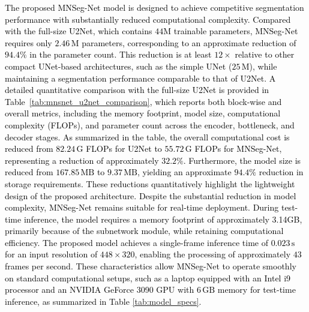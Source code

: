 \textcolor{black}{The proposed MNSeg-Net model is designed to achieve competitive segmentation performance with substantially reduced computational complexity. Compared with the full-size U2Net, which contains $44 \text{M}$ trainable parameters, MNSeg-Net requires only $2.46\,\text{M}$ parameters, corresponding to an approximate reduction of $94.4\%$ in the parameter count. This reduction is at least $12\times$ relative to other compact UNet-based architectures, such as the simple UNet ($25\,\text{M}$), while maintaining a segmentation performance comparable to that of U2Net. A detailed quantitative comparison with the full-size U2Net is provided in Table~\ref{tab:mnsnet_u2net_comparison}, which reports both block-wise and overall metrics, including the memory footprint, model size, computational complexity (FLOPs), and parameter count across the encoder, bottleneck, and decoder stages. As summarized in the table, the overall computational cost is reduced from $82.24\,\text{G}$ FLOPs for U2Net to $55.72\,\text{G}$ FLOPs for MNSeg-Net, representing a reduction of approximately $32.2\%$. Furthermore, the model size is reduced from $167.85\,\text{MB}$ to $9.37\,\text{MB}$, yielding an approximate $94.4\%$ reduction in storage requirements. These reductions quantitatively highlight the lightweight design of the proposed architecture. Despite the substantial reduction in model complexity, MNSeg-Net remains suitable for real-time deployment. During test-time inference, the model requires a memory footprint of approximately 3.14GB, primarily because of the subnetwork module, while retaining computational efficiency. The proposed model achieves a single-frame inference time of $0.023\,\text{s}$ for an input resolution of $448 \times 320$, enabling the processing of approximately $43$ frames per second. These characteristics allow MNSeg-Net to operate smoothly on standard computational setups, such as a laptop equipped with an Intel i9 processor and an NVIDIA GeForce 3090 GPU with $6\,\text{GB}$ memory for test-time inference, as summarized in Table \ref{tab:model_specs}.}










